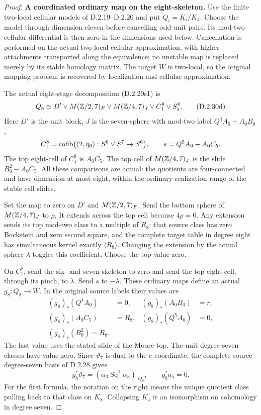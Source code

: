 \begin{proof}
\medskip\noindent
\textbf{A coordinated ordinary map on the eight-skeleton.}
Use the finite two-local cellular models of
D.2.19--D.2.20 and put $Q_i=K_i/K_4$.
Choose the model through dimension eleven before
cancelling odd-unit pairs. Its mod-two cellular
differential is then zero in the dimensions used below.
Cancellation is performed on the actual two-local
cellular approximation, with higher attachments
transported along the equivalence; no unstable map is
replaced merely by its stable homology matrix.
The target $W$ is two-local, so the original mapping
problem is recovered by localization and cellular
approximation.

The actual eight-stage decomposition
\textup{(D.2.20s1)} is
\[
 Q_8\simeq D'\vee M(\mathbb Z/2,7)_F\vee M(\mathbb Z/4,7)_J
                \vee C_1^8\vee S^8_s.
 \tag{D.2.30d}
\]
Here $D'$ is the unit block, $J$ is the seven-sphere
with mod-two label $Q^4A_0+A_0B_0$,
\[
 C_1^8=\operatorname{cofib}\bigl((2,\eta_6):S^6\vee S^7\to S^6\bigr),
 \qquad s=Q^5A_0-A_0C_5.
\]
The top eight-cell of $C_1^8$ is $A_0C_5$.
The top cell of $M(\mathbb Z/4,7)_J$ is the slide
$B_0^2-A_0C_5$. All these comparisons are actual:
the quotients are four-connected and have dimension
at most eight, within the ordinary realization range
of the stable cell slides.

Set the map to zero on $D'$ and $M(\mathbb Z/2,7)_F$.
Send the bottom sphere of $M(\mathbb Z/4,7)_J$ to $\rho$.
It extends across the top cell because $4\rho=0$.
Any extension sends its top mod-two class to a multiple
of $R_8$: that source class has zero Bockstein and
zero second square, and the complete target table
in degree eight has simultaneous kernel exactly
$\langle R_8\rangle$.
Changing the extension by the actual sphere $\lambda$
toggles this coefficient. Choose the top value zero.

On $C_1^8$, send the six- and seven-skeleton to zero
and send the top eight-cell, through its pinch, to
$\lambda$. Send $s$ to $-\lambda$.
These ordinary maps define an actual $g_8:Q_8\to W$.
In the original source labels their values are
\[
 \begin{aligned}
 (g_8)_*(Q^4A_0)&=0,&(g_8)_*(A_0B_0)&=r,\\
 (g_8)_*(A_0C_5)&=R_8,&(g_8)_*(Q^5A_0)&=0,\\
 (g_8)_*(B_0^2)=R_8.
 \end{aligned}
 \tag{D.2.30e}
\]
The last value uses the stated slide of the Moore top.
The unit degree-seven classes have value zero.
Since $\vartheta_7$ is dual to the $e$ coordinate,
the complete source degree-seven basis of D.2.28 gives
\[
 g_8^*\vartheta_7=
          (\alpha_3\operatorname{Sq}^1\alpha_3)|_{Q_8},
 \qquad g_8^*a_5=0.
 \tag{D.2.30f}
\]
For the first formula, the notation on the right means
the unique quotient class pulling back to that class
on $K_8$. Collapsing $K_4$ is an isomorphism on
cohomology in degree seven.


\end{proof}
